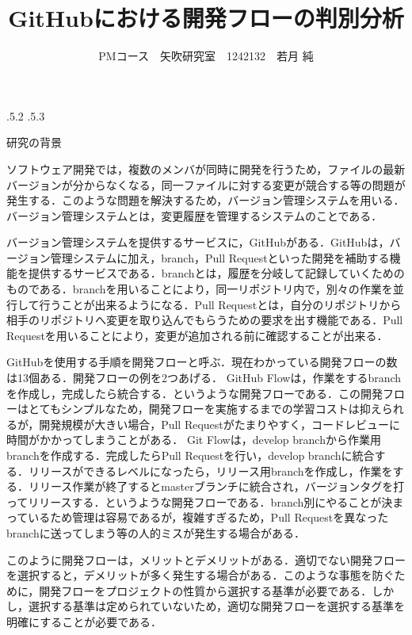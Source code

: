 \documentclass[uplatex]{jsarticle}
\title{\vspace{-14mm}GitHubにおける開発フローの判別分析}
\author{PMコース　矢吹研究室　1242132　若月 純}
\date{}%
\makeatletter
\renewcommand{\section}{%
    \if@slide\clearpage\fi
    \@startsection{section}{1}{\z@}%
    {\Cvs \@plus.5\Cdp \@minus.2\Cdp}%
    {.5\Cvs \@plus.3\Cdp}%
    {\normalfont\raggedright}}
\makeatother
\begin{document}
\maketitle





\section{研究の背景}

ソフトウェア開発では，複数のメンバが同時に開発を行うため，ファイルの最新バージョンが分からなくなる，同一ファイルに対する変更が競合する等の問題が発生する．このような問題を解決するため，バージョン管理システムを用いる．バージョン管理システムとは，変更履歴を管理するシステムのことである\cite{ikeda2014}．

バージョン管理システムを提供するサービスに，GitHubがある．GitHubは，バージョン管理システムに加え，branch，Pull Requestといった開発を補助する機能を提供するサービスである．branchとは，履歴を分岐して記録していくためのものである．branchを用いることにより，同一リポジトリ内で，別々の作業を並行して行うことが出来るようになる．Pull Requestとは，自分のリポジトリから相手のリポジトリへ変更を取り込んでもらうための要求を出す機能である．Pull Requestを用いることにより，変更が追加される前に確認することが出来る．

GitHubを使用する手順を開発フローと呼ぶ．現在わかっている開発フローの数は13個ある．開発フローの例を2つあげる．
GitHub Flowは，作業をするbranchを作成し，完成したら統合する．というような開発フローである．この開発フローはとてもシンプルなため，開発フローを実施するまでの学習コストは抑えられるが，開発規模が大きい場合，Pull Requestがたまりやすく，コードレビューに時間がかかってしまうことがある．
Git Flowは，develop branchから作業用branchを作成する．完成したらPull Requestを行い，develop branchに統合する．リリースができるレベルになったら，リリース用branchを作成し，作業をする．リリース作業が終了するとmasterブランチに統合され，バージョンタグを打ってリリースする．というような開発フローである．branch別にやることが決まっているため管理は容易であるが，複雑すぎるため，Pull Requestを異なったbranchに送ってしまう等の人的ミスが発生する場合がある\cite{otsuka2014}．

このように開発フローは，メリットとデメリットがある．適切でない開発フローを選択すると，デメリットが多く発生する場合がある．このような事態を防ぐために，開発フローをプロジェクトの性質から選択する基準が必要である．しかし，選択する基準は定められていないため，適切な開発フローを選択する基準を明確にすることが必要である．
\end{document}
